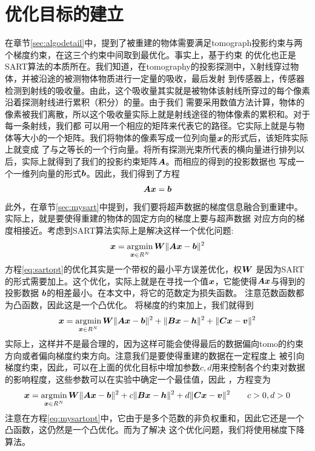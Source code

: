\section{优化目标的建立}\label{sec:optobj}
在章节\ref{sec:algodetail}中，提到了被重建的物体需要满足tomograph投影约束与两个梯度约束，在这三个约束中间取到最优化。事实上，基于约束
的优化也正是SART算法的本质所在。我们知道，在tomography的投影探测中，X射线穿过物体，并被沿途的被测物体物质进行一定量的吸收，最后发射
到传感器上，传感器检测到射线的吸收量。由此，这个吸收量其实就是被物体该射线所穿过的每个像素沿着探测射线进行累积（积分）的量。由于我们
需要采用数值方法计算，物体的像素被我们离散，所以这个吸收量实际上就是射线途径的物体像素的累积和。对于每一条射线，我们都
可以用一个相应的矩阵来代表它的路径。它实际上就是与物体等大小的一个矩阵。我们将物体的像素写成一位列向量$\bm{ x}$的形式后，该矩阵实际上就变成
了与之等长的一个行向量。将所有探测光束所代表的横向量进行排列以后，实际上就得到了我们的投影约束矩阵$\bm{ A}$。而相应的得到的投影数据也
写成一个一维列向量的形式$\bm{b}$。因此，我们得到了方程
\begin{equation}
\bm{ A}\bm{ x} = \bm{b} \label{eq:tomocon}
\end{equation}
此外，在章节\ref{sec:mysart}中提到，我们要将超声数据的梯度信息融合到重建中。实际上，就是要使得重建的物体的固定方向的梯度上要与超声数据
对应方向的梯度相接近。考虑到SART算法实际上是解决这样一个优化问题:
\begin{equation}
\bm{ x} = \operatorname*{\arg\!\min}_{\bm{ x}\in R^N}\bm{ W}\lVert\bm{ A}\bm{ x}-\bm{b}\rVert^2 \label{eq:sartopt}
\end{equation}
方程\eqref{eq:sartopt}的优化其实是一个带权的最小平方误差优化，权$\bm{ W}$ 是因为SART的形式需要加上。这个优化，实际上就是在寻找一个值$\bm{ x}$，它能使得$\bm{ A}\bm{ x}$与得到的投影数据 $\bm{b}$的相差最小。在本文中，将它的范数定为损失函数。
注意范数函数都为凸函数，因此这是一个凸优化。
将梯度的约束加上，我们就得到
\begin{equation}
\bm{ x} = \operatorname*{\arg\!\min}_{\bm{ x}\in R^N}\bm{ W}\lVert\bm{ A}\bm{ x}-\bm{b}\rVert^2 +\lVert\bm{ B}\bm{ x}-\bm{ h}\rVert^2+\lVert\bm{C}\bm{ x}-\bm{ v}\rVert^2 \notag
\end{equation}
实际上，这样并不是最合理的，因为这样可能会使得最后的数据偏向tomo的约束方向或者偏向梯度约束方向。注意我们是要使得重建的数据在一定程度上
被引向梯度约束，因此，可以在上面的优化目标中增加参数$c,d$用来控制各个约束对数据的影响程度，这些参数可以在实验中确定一个最佳值，因此
，方程变为
\begin{equation}
\bm{ x} = \operatorname*{\arg\!\min}_{\bm{ x}\in R^N}\bm{ W}\lVert\bm{ A}\bm{ x}-\bm{b}\rVert^2 +c\lVert\bm{ B}\bm{ x}-\bm{ h}\rVert^2+d\lVert\bm{C}\bm{ x}-\bm{ v}\rVert^2 \qquad c>0,d>0 \label{eq:mysartopt}
\end{equation}
注意在方程\eqref{eq:mysartopt}中，它由于是多个范数的非负权重和，因此它还是一个凸函数\cite{boyd2004convex}，这仍然是一个凸优化。而为了解决
这个优化问题，我们将使用梯度下降算法\cite{nesterov2003}。
